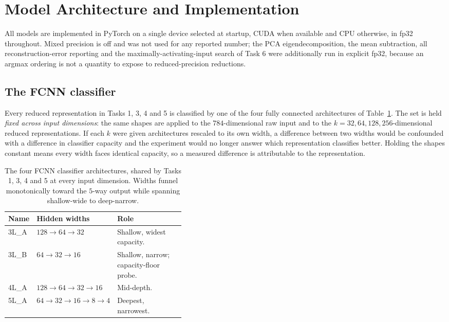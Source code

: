 \documentclass[11pt,a4paper]{article}
\begin{document}
\section{Model Architecture and Implementation}\label{sec:arch}
All models are implemented in PyTorch on a single device selected at startup, CUDA when available
and CPU otherwise, in fp32 throughout.  Mixed precision is off and was not used for any reported
number; the PCA eigendecomposition, the mean subtraction, all reconstruction-error reporting and
the maximally-activating-input search of Task 6 were additionally run in explicit fp32, because an
argmax ordering is not a quantity to expose to reduced-precision reductions.

\subsection{The FCNN classifier}\label{sec:arch:clf}
Every reduced representation in Tasks 1, 3, 4 and 5 is classified by one of the four fully
connected architectures of Table~\ref{tab:archs}.  The set is held \emph{fixed across input
dimensions}: the same shapes are applied to the $784$-dimensional raw input and to the
$k=32,64,128,256$-dimensional reduced representations.  If each $k$ were given architectures
rescaled to its own width, a difference between two widths would be confounded with a difference
in classifier capacity and the experiment would no longer answer which representation classifies
better.  Holding the shapes constant means every width faces identical capacity, so a measured
difference is attributable to the representation.

\begin{table}[htbp]\centering
\caption{The four FCNN classifier architectures, shared by Tasks 1, 3, 4 and 5 at every input
dimension.  Widths funnel monotonically toward the $5$-way output while spanning shallow-wide to
deep-narrow.}\label{tab:archs}
\begin{tabular}{@{}llp{0.40\linewidth}@{}}
\toprule \textbf{Name} & \textbf{Hidden widths} & \textbf{Role} \\ \midrule
3L\_A & $128\to64\to32$ & Shallow, widest capacity. \\
3L\_B & $64\to32\to16$ & Shallow, narrow; capacity-floor probe. \\
4L\_A & $128\to64\to32\to16$ & Mid-depth. \\
5L\_A & $64\to32\to16\to8\to4$ & Deepest, narrowest. \\
\bottomrule
\end{tabular}
\end{table}
\end{document}
